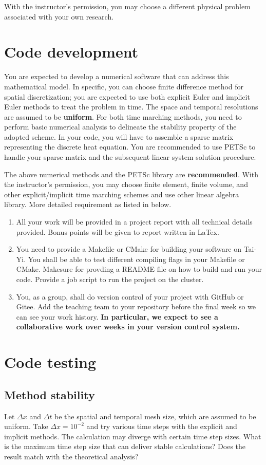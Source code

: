 \documentclass[12pt]{article}
\begin{document}
With the instructor's permission, you may choose a different physical problem associated with your own research.

\section{Code development}
You are expected to develop a numerical software that can address this mathematical model. In specific, you can choose finite difference method for spatial discretization; you are expected to use both explicit Euler and implicit Euler methods to treat the problem in time. The space and temporal resolutions are assumed to be \textbf{uniform}. For both time marching methods, you need to perform basic numerical analysis to delineate the stability property of the adopted scheme. In your code, you will have to assemble a sparse matrix representing the discrete heat equation. You are recommended to use PETSc to handle your sparse matrix and the subsequent linear system solution procedure. 

The above numerical methods and the PETSc library are \textbf{recommended}. With the instructor's permission, you may choose finite element, finite volume, and other explicit/implicit time marching schemes and use other linear algebra library. More detailed requirement as listed in below.
\begin{enumerate}
\item All your work will be provided in a project report with all technical details provided. Bonus points will be given to report written in LaTex.
\item You need to provide a Makefile or CMake for building your software on Tai-Yi. You shall be able to test different compiling flags in your Makefile or CMake. Makesure for provding a README file on how to build and run your code. Provide a job script to run the project on the cluster.
\item You, as a group, shall do version control of your project with GitHub or Gitee. Add the teaching team to your repository before the final week so we can see your work history. \textbf{In particular, we expect to see a collaborative work over weeks in your version control system.}
\end{enumerate}

\section{Code testing}
\subsection{Method stability}
Let $\Delta x$ and $\Delta t$ be the spatial and temporal mesh size, which are assumed to be uniform. Take $\Delta x = 10^{-2}$ and try various time steps with the explicit and implicit methods. The calculation may diverge with certain time step sizes. What is the maximum time step size that can deliver stable calculations? Does the result match with the theoretical analysis?
\end{document}
